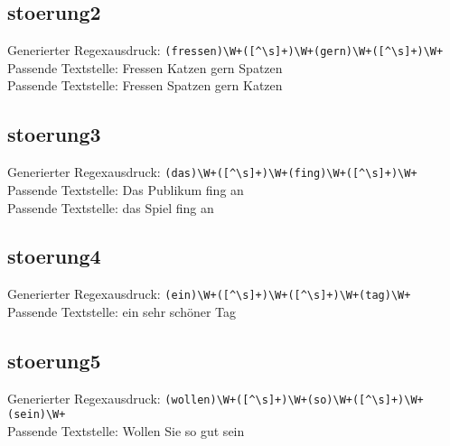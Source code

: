 \subsection{stoerung2}\label{subsec:stoerung2}
Generierter Regexausdruck: \verb/(fressen)\W+([^\s]+)\W+(gern)\W+([^\s]+)\W+/ \\
Passende Textstelle: Fressen Katzen gern Spatzen \\
Passende Textstelle: Fressen Spatzen gern Katzen

\subsection{stoerung3}\label{subsec:stoerung3}
Generierter Regexausdruck: \verb/(das)\W+([^\s]+)\W+(fing)\W+([^\s]+)\W+/ \\
Passende Textstelle: Das Publikum fing an \\
Passende Textstelle: das Spiel fing an

\subsection{stoerung4}\label{subsec:stoerung4}
Generierter Regexausdruck: \verb/(ein)\W+([^\s]+)\W+([^\s]+)\W+(tag)\W+/ \\
Passende Textstelle: ein sehr schöner Tag

\subsection{stoerung5}\label{subsec:stoerung5}
Generierter Regexausdruck: \verb/(wollen)\W+([^\s]+)\W+(so)\W+([^\s]+)\W+(sein)\W+/ \\
Passende Textstelle: Wollen Sie so gut sein



